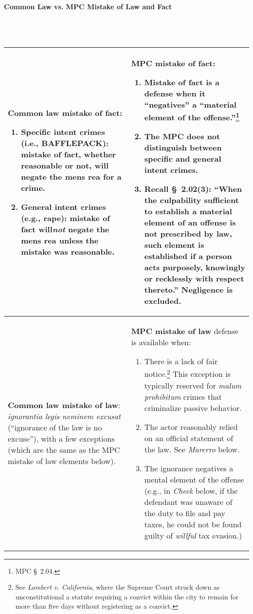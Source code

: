 \paragraph{Common Law vs. MPC Mistake of Law and Fact}
~\\\\
\begin{tabular}{ | p{5.5cm} | p{5.5cm} |}
\hline
    \textbf{Common law mistake of fact:}
    \begin{enumerate}
        \item Specific intent crimes (i.e., BAFFLEPACK): mistake of fact, 
        whether reasonable or not, will negate the mens rea for a crime.
        \item General intent crimes (e.g., rape): mistake of fact 
        will\emph{not} negate the mens rea unless the mistake was reasonable.
    \end{enumerate} &
    \textbf{MPC mistake of fact:}
    \begin{enumerate}
        \item Mistake of fact is a defense when it ``negatives'' a ``material 
        element of the offense.''\footnote{MPC \S\ 2.04.}
        \item The MPC does not distinguish between specific and general intent 
        crimes.
        \item Recall \S\ 2.02(3): ``When the culpability sufficient to 
        establish a material element of an offense is not prescribed by law, 
        such element is established if a person acts purposely, knowingly or 
        recklessly with respect thereto.'' Negligence is excluded.
    \end{enumerate} \\ \hline
    \textbf{Common law mistake of law}: \emph{ignorantia legis neminem 
    excusat} (``ignorance of the law is no excuse''), with a 
    few exceptions (which are the same as the MPC mistake of law elements 
    below). &
    \textbf{MPC mistake of law} defense is available when:
    \begin{enumerate}
        \item There is a lack of fair notice.\footnote{See \emph{Lambert v. 
        California}, where the Supreme Court struck down as unconstitutional a 
        statute requiring a convict within the city to remain for more than 
        five days without registering as a convict.} This exception is 
        typically reserved for \emph{malum prohibitum} crimes that criminalize 
        passive behavior.
        \item The actor reasonably relied on an official statement of the law. 
        See \emph{Marerro} below.
        \item The ignorance negatives a mental element of the offense (e.g.,  
        in \emph{Cheek} below, if the defendant was unaware of the duty to 
        file and pay taxes, he could not be found guilty of \emph{willful} tax 
        evasion.)
    \end{enumerate} \\
\hline
\end{tabular}

